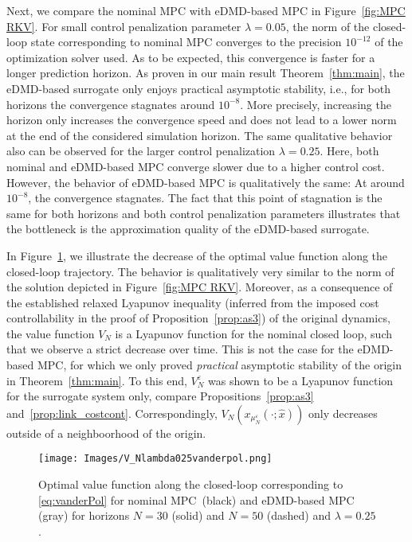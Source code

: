 \documentclass{article}
\numberwithin{equation}{section}
\begin{document}
	\noindent Next, we compare the nominal MPC with eDMD-based MPC in Figure~\ref{fig:MPC RKV}. For small control penalization parameter $\lambda = 0.05$, the norm of the closed-loop state corresponding to nominal MPC %
	converges to the precision $10^{-12}$ of the optimization solver used. As to be expected, this convergence is faster for a longer prediction horizon. As proven in our main result Theorem~\ref{thm:main}, the eDMD-based surrogate only enjoys practical asymptotic stability, i.e., for both horizons the convergence stagnates around $10^{-8}$. More precisely, increasing the horizon only increases the convergence speed and does not lead to a lower norm at the end of the considered simulation horizon. The same qualitative behavior also can be observed for the larger control penalization $\lambda = 0.25$. Here, both nominal and eDMD-based MPC converge slower due to a higher control cost. However, the behavior of eDMD-based MPC
	is qualitatively the same: At around $10^{-8}$, the convergence stagnates. The fact that this point of stagnation is the same for both horizons and both control penalization parameters illustrates that the bottleneck is the approximation quality of the eDMD-based surrogate. 
	
	In Figure~\ref{fig:VN vanderpol}, we illustrate the decrease of the optimal value function along the closed-loop trajectory. The behavior is qualitatively very similar to the norm of the solution depicted in Figure~\ref{fig:MPC RKV}. Moreover, as a consequence of the established relaxed Lyapunov inequality (inferred from the imposed cost controllability in the proof of Proposition~\ref{prop:as3}) 
	of the original dynamics, the value function $V_N$ is a Lyapunov function for the nominal closed loop, such that we observe a strict decrease over time. This is not the case for the eDMD-based MPC, for which we only proved \emph{practical} asymptotic stability of the origin in Theorem~\ref{thm:main}. To this end, $V_N^\varepsilon$ was shown to be a Lyapunov function for the surrogate system only, compare Propositions~\ref{prop:as3} and~\ref{prop:link_costcont}. Correspondingly, $V_N(x_{\mu_N^{\varepsilon}}(\cdot;\hat{x}))$ only decreases outside of a neighboorhood of the origin. 
	\begin{figure}[htb]
		\centering
		\texttt{[image: Images/V\_Nlambda025vanderpol.png]}
		\caption{Optimal value function along the closed-loop corresponding to \eqref{eq:vanderPol} for nominal MPC~(black) and eDMD-based MPC (gray) for horizons $N = 30$ (solid) and $N = 50$ (dashed) and $\lambda = 0.25$.}
		\label{fig:VN vanderpol}
	\end{figure}
	
\end{document}
